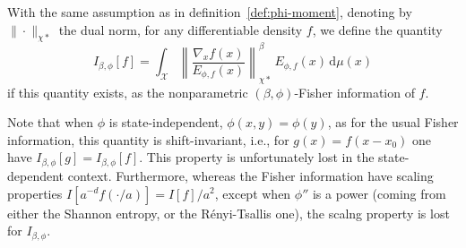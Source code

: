 \documentclass[entropy,article,submit,moreauthors,pdftex]{Definitions/mdpi}
\newcommand{\SZ}[1]{{\color{blue} #1}}                                       %
\def\dmu{\mathrm{d}\mu}%
\def\X{\mathcal{X}}%
\begin{document}
\begin{Definition}
\label{def:np-phi-Fisher}
%
  With the  same assumption  as in definition~\ref{def:phi-moment},  denoting by
  $\| \cdot  \|_{\chi*}$ the dual norm,  for any differentiable density  $f$, we
  define the quantity
  \begin{equation}\label{eq:np-phi-Fisher}
  I_{\beta,\phi}[f] = \int_\X \left\| \frac{\nabla_x f(x)}{E_{\phi,f}(x)}
    \right\|_{\chi*}^\beta \, E_{\phi,f}(x) \, \dmu(x)
  \end{equation}
  if   this  quantity   exists,  as   the   nonparametric  $(\beta,\phi)$-Fisher
  information of $f$.
\end{Definition}
%
Note that  when $\phi$ is state-independent,  $\phi(x,y) = \phi(y)$, as  for the
usual Fisher  information, this quantity  is shift-invariant, i.e., for  $g(x) =
f(x-x_0)$  one have  $I_{\beta,\phi}[g] =  I_{\beta,\phi}[f]$. This  property is
unfortunately lost in the  state-dependent context. \SZ{Furthermore, whereas the
  Fisher information have scaling  properties $I[a^{-d} f(\cdot/a)] = I[f]/a^2$,
  except when  $\phi''$ is a power  (coming from either the  Shannon entropy, or
  the R\'enyi-Tsallis one), the scalng property is lost for $I_{\beta,\phi}$.}
\end{document}
